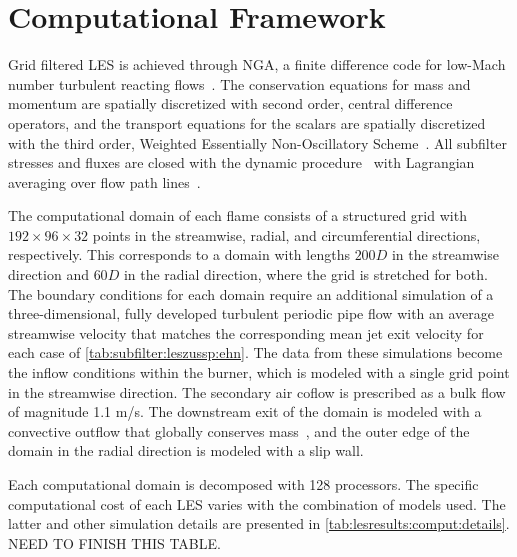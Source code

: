 \section{Computational Framework}
\label{sec:lesresults:comput}

Grid filtered LES is achieved through NGA, a finite difference code for low-Mach number turbulent reacting flows~\cite{desjardins2008}. The conservation equations for mass and momentum are spatially discretized with second order, central difference operators, and the transport equations for the scalars are spatially discretized with the third order, Weighted Essentially Non-Oscillatory Scheme~\cite{jiang1996}. All subfilter stresses and fluxes are closed with the dynamic procedure~\cite{germano1991,lilly1992,moin1991} with Lagrangian averaging over flow path lines~\cite{meneveau1996,reveillon1996}.

The computational domain of each flame consists of a structured grid with $192 \times 96 \times 32$ points in the streamwise, radial, and circumferential directions, respectively. This corresponds to a domain with lengths $200D$ in the streamwise direction and $60D$ in the radial direction, where the grid is stretched for both. The boundary conditions for each domain require an additional simulation of a three-dimensional, fully developed turbulent periodic pipe flow with an average streamwise velocity that matches the corresponding mean jet exit velocity for each case of \cref{tab:subfilter:leszussp:ehn}. The data from these simulations become the inflow conditions within the burner, which is modeled with a single grid point in the streamwise direction. The secondary air coflow is prescribed as a bulk flow of magnitude 1.1 m/s. The downstream exit of the domain is modeled with a convective outflow that globally conserves mass~\cite{akselvoll1996}, and the outer edge of the domain in the radial direction is modeled with a slip wall.

Each computational domain is decomposed with 128 processors. The specific computational cost of each LES varies with the combination of models used. The latter and other simulation details are presented in \cref{tab:lesresults:comput:details}. NEED TO FINISH THIS TABLE.

